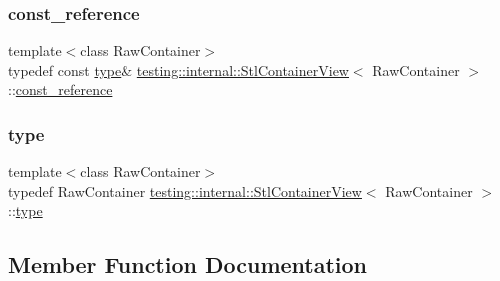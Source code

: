 \subsubsection{\texorpdfstring{const\+\_\+reference}{const\_reference}}
{\footnotesize\ttfamily template$<$class Raw\+Container$>$ \\
typedef const \hyperlink{classtesting_1_1internal_1_1_stl_container_view_a2b2c63a6dcdbfe63fb0ee121ebf463ba}{type}\& \hyperlink{classtesting_1_1internal_1_1_stl_container_view}{testing\+::internal\+::\+Stl\+Container\+View}$<$ Raw\+Container $>$\+::\hyperlink{classtesting_1_1internal_1_1_stl_container_view_a9cd4f6ed689b3938cdb7b3c4cbf1b36b}{const\+\_\+reference}}

\mbox{\label{classtesting_1_1internal_1_1_stl_container_view_a2b2c63a6dcdbfe63fb0ee121ebf463ba}} 
\subsubsection{\texorpdfstring{type}{type}}
{\footnotesize\ttfamily template$<$class Raw\+Container$>$ \\
typedef Raw\+Container \hyperlink{classtesting_1_1internal_1_1_stl_container_view}{testing\+::internal\+::\+Stl\+Container\+View}$<$ Raw\+Container $>$\+::\hyperlink{classtesting_1_1internal_1_1_stl_container_view_a2b2c63a6dcdbfe63fb0ee121ebf463ba}{type}}



\subsection{Member Function Documentation}
\mbox{\label{classtesting_1_1internal_1_1_stl_container_view_a36eccf53329730f6e55c12002128bf25}} 
